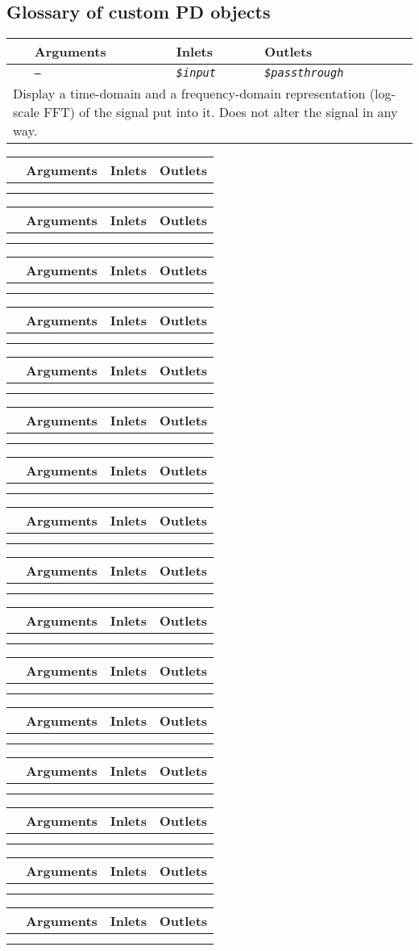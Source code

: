 \subsection{Glossary of custom PD objects}
\label{x:glossary}

\newcommand{\pdobject}[5]{%
\vspace*{-\baselineskip}%
\begin{table}[H]%
\begin{tabular}{llll}%
 & \textbf{Arguments} & \textbf{Inlets} & \textbf{Outlets} \\ \hline
\rowcolor[HTML]{EFEFEF} 
\multicolumn{1}{l|}{\cellcolor[HTML]{EFEFEF}\textbf{\texttt{#1}}} & \multicolumn{1}{l|}{\cellcolor[HTML]{EFEFEF}\textit{\texttt{#2}}} & \multicolumn{1}{l|}{\cellcolor[HTML]{EFEFEF}\textit{\texttt{#3}}} & \multicolumn{1}{l}{\cellcolor[HTML]{EFEFEF}\textit{\texttt{#4}}} \\ \hline
\multicolumn{4}{p{\textwidth}}{#5} \\ 
\end{tabular}%
\end{table}%
}

\pdobject{analyser\char`~}{–}{\$input}{\$passthrough}{
Display a time-domain and a frequency-domain representation (log-scale FFT) of the signal put into it. Does not alter the signal in any way.}

\pdobject{defaultarg}{}{}{}{}
\pdobject{fmt\char`~}{}{}{}{}
\pdobject{formatlabel}{}{}{}{}
\pdobject{interface}{}{}{}{}
\pdobject{lfmodel\char`~}{}{}{}{}
\pdobject{master\char`~}{}{}{}{}
\pdobject{msgpipe}{}{}{}{}
\pdobject{quasirandomdrift}{}{}{}{}
\pdobject{rdefault}{}{}{}{}
\pdobject{recall}{}{}{}{}
\pdobject{rls}{}{}{}{}
\pdobject{round}{}{}{}{}
\pdobject{rqlist}{}{}{}{}
\pdobject{snapchange\char`~}{}{}{}{}
\pdobject{source\char`~}{}{}{}{}
\pdobject{synth}{}{}{}{}
